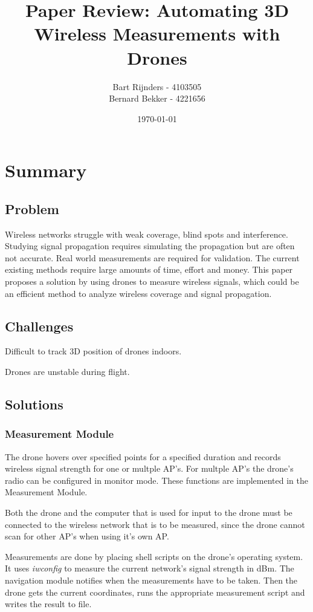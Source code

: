 \documentclass{IEEEtran}
\title{Paper Review: Automating 3D Wireless Measurements with Drones}
\date{\today}
\author{
Bart Rijnders - 4103505 \\
Bernard Bekker - 4221656 
}
\begin{document}
\maketitle

\section{Summary}

\subsection{Problem}

Wireless networks struggle with weak coverage, blind spots and interference. Studying signal propagation requires simulating the propagation but are often not accurate. Real world measurements are required for validation. The current existing methods require large amounts of time, effort and money. This paper proposes a solution by using drones to measure wireless signals, which could be an efficient method to analyze wireless coverage and signal propagation.

\subsection{Challenges}

Difficult to track 3D position of drones indoors.

Drones are unstable during flight.

\subsection{Solutions}

\subsubsection{Measurement Module}

The drone hovers over specified points for a specified duration and records wireless signal strength for one or multple AP's. For multple AP's the drone's radio can be configured in monitor mode. These functions are implemented in the Measurement Module.

Both the drone and the computer that is used for input to the drone must be connected to the wireless network that is to be measured, since the drone cannot scan for other AP's when using it's own AP.

Measurements are done by placing shell scripts on the drone's operating system. It uses \textit{iwconfig} to measure the current network's signal strength in dBm. The navigation module notifies when the measurements have to be taken. Then the drone gets the current coordinates, runs the appropriate measurement script and writes the result to file.
\end{document}
